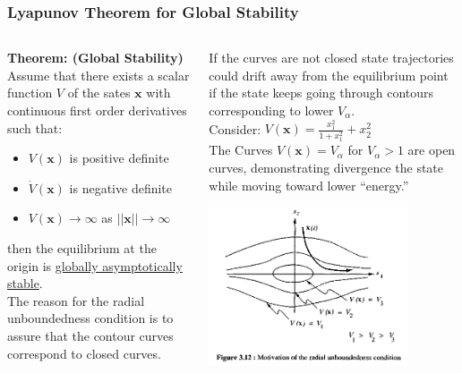 \documentclass[11pt,handout]{beamer}   %
\begin{document}
\begin{frame}
\frametitle{Lyapunov Theorem for Global Stability}
\small 
\begin{columns}
\begin{column}{0.5\textwidth}
\textbf{Theorem: (Global Stability)}\\
Assume that there exists a scalar function $V$ of the sates $\mathbf{x}$ with continuous first order derivatives such that:
\begin{itemize}
\item $V(\mathbf{x})$ is positive definite
\item $\dot{V}(\mathbf{x})$ is negative definite
\item $V(\mathbf{x}) \rightarrow \infty$ as $||\mathbf{x}|| \rightarrow \infty$
\end{itemize}
then the equilibrium at the origin is \underline{globally asymptotically stable}.\\
\vspace{6pt}
The reason for the radial unboundedness condition is to assure that the contour curves correspond to closed curves. 
\end{column}
\begin{column}{0.5\textwidth}
If the curves are not closed state trajectories could drift away from the equilibrium point if the state keeps going through contours corresponding to lower $V_\alpha$.\\
Consider: $V(\mathbf{x}) = \frac{x_1^2}{1+x_1^2} + x_2^2$\\
The Curves $V(\mathbf{x}) = V_\alpha$ for $V_\alpha > 1$ are open curves, demonstrating divergence the state while moving toward lower ``energy.''
\begin{center}
\includegraphics[width = 0.8\textwidth]{Figures/Fig312.PNG}
\end{center}
\end{column}
\end{columns}
\end{frame}
\end{document}
